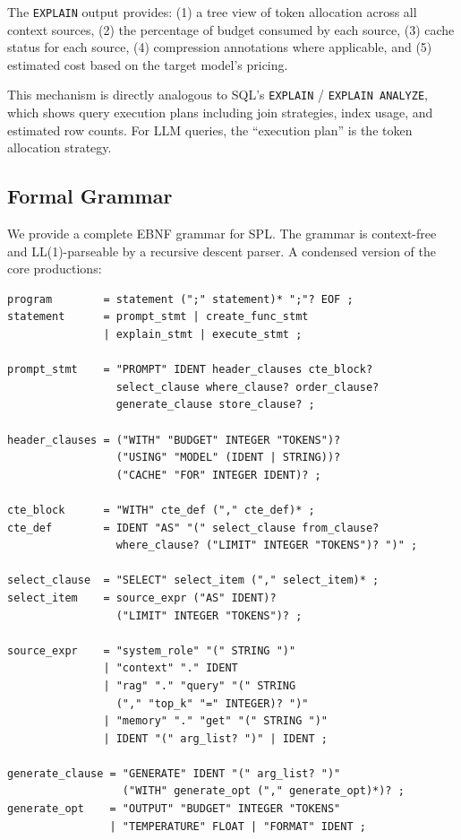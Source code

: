 \documentclass[11pt,a4paper]{article}
\begin{document}
The \texttt{EXPLAIN} output provides: (1) a tree view of token allocation across all context sources, (2) the percentage of budget consumed by each source, (3) cache status for each source, (4) compression annotations where applicable, and (5) estimated cost based on the target model's pricing.

This mechanism is directly analogous to SQL's \texttt{EXPLAIN} / \texttt{EXPLAIN ANALYZE}, which shows query execution plans including join strategies, index usage, and estimated row counts. For LLM queries, the ``execution plan'' is the token allocation strategy.

\subsection{Formal Grammar}

We provide a complete EBNF grammar for SPL. The grammar is context-free and LL(1)-parseable by a recursive descent parser. A condensed version of the core productions:

\begin{lstlisting}[style=ebnf, caption={SPL grammar (condensed EBNF)}]
program        = statement (";" statement)* ";"? EOF ;
statement      = prompt_stmt | create_func_stmt
               | explain_stmt | execute_stmt ;

prompt_stmt    = "PROMPT" IDENT header_clauses cte_block?
                 select_clause where_clause? order_clause?
                 generate_clause store_clause? ;

header_clauses = ("WITH" "BUDGET" INTEGER "TOKENS")?
                 ("USING" "MODEL" (IDENT | STRING))?
                 ("CACHE" "FOR" INTEGER IDENT)? ;

cte_block      = "WITH" cte_def ("," cte_def)* ;
cte_def        = IDENT "AS" "(" select_clause from_clause?
                 where_clause? ("LIMIT" INTEGER "TOKENS")? ")" ;

select_clause  = "SELECT" select_item ("," select_item)* ;
select_item    = source_expr ("AS" IDENT)?
                 ("LIMIT" INTEGER "TOKENS")? ;

source_expr    = "system_role" "(" STRING ")"
               | "context" "." IDENT
               | "rag" "." "query" "(" STRING
                 ("," "top_k" "=" INTEGER)? ")"
               | "memory" "." "get" "(" STRING ")"
               | IDENT "(" arg_list? ")" | IDENT ;

generate_clause = "GENERATE" IDENT "(" arg_list? ")"
                  ("WITH" generate_opt ("," generate_opt)*)? ;
generate_opt    = "OUTPUT" "BUDGET" INTEGER "TOKENS"
                | "TEMPERATURE" FLOAT | "FORMAT" IDENT ;
\end{lstlisting}
\end{document}
